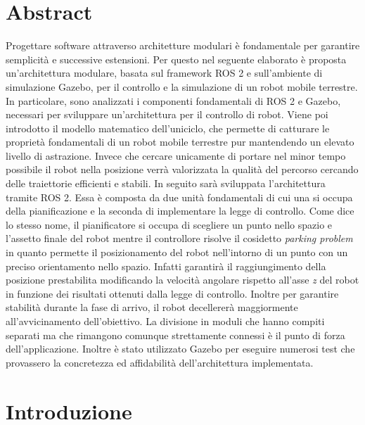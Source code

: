 \documentclass[a4paper,11 pt,oneside]{book}
\theoremstyle{definition}
\begin{document}
	 
	\newpage
	\thispagestyle{empty}

\chapter*{Abstract}
Progettare software attraverso architetture modulari è fondamentale per garantire semplicità e successive estensioni. Per questo nel seguente elaborato è proposta un'architettura modulare, basata sul framework ROS 2 e sull'ambiente di simulazione Gazebo, per il controllo e la simulazione di un robot mobile terrestre. In particolare, sono analizzati i componenti fondamentali di ROS 2 e Gazebo, necessari per sviluppare un'architettura per il controllo di robot. 
Viene poi introdotto il modello matematico dell'uniciclo, che permette di catturare le proprietà fondamentali di un robot mobile terrestre pur mantendendo un elevato livello di astrazione. Invece che cercare unicamente di portare nel minor tempo possibile il robot nella posizione verrà valorizzata la qualità del percorso cercando delle traiettorie efficienti e stabili.
In seguito sarà sviluppata l'architettura tramite ROS 2.
Essa è composta da due unità fondamentali di cui una si occupa della pianificazione e la seconda di implementare la legge di controllo.
Come dice lo stesso nome, il pianificatore si occupa di scegliere un punto nello spazio e l'assetto finale del robot mentre il controllore risolve il cosidetto \emph{parking problem} in quanto permette il posizionamento del robot nell'intorno di un punto con un preciso orientamento nello spazio. Infatti garantirà il raggiungimento della posizione prestabilita modificando la velocità angolare rispetto all'asse \emph{z} del robot in funzione dei risultati ottenuti dalla legge di controllo. Inoltre per garantire stabilità durante la fase di arrivo, il robot decellererà maggiormente all'avvicinamento dell'obiettivo.
La divisione in moduli che hanno compiti separati ma che rimangono comunque strettamente connessi è il punto di forza dell'applicazione.
Inoltre è stato utilizzato Gazebo per eseguire numerosi test che provassero la concretezza ed affidabilità dell'architettura implementata. 


	\tableofcontents\thispagestyle{empty}
	\listoffigures\thispagestyle{empty}
	\mainmatter
	\chapter*{Introduzione}
	
\end{document}
